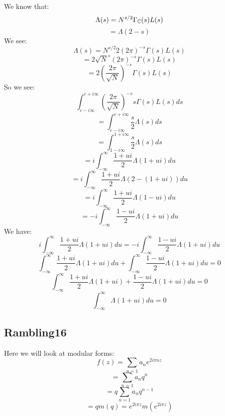 \documentclass[a4paper]{amsart}
\begin{document}
We know that:
$$\Lambda(s) = N^{s/2} \Gamma_{\mathbb{C}}(s) L(s)$$
$$ = \Lambda(2 - s)$$
We see: 
$$\Lambda(s) = N^{s/2} 2 (2\pi)^{-s} \Gamma(s) L(s)$$
$$ = 2 \sqrt{N}^{s} (2\pi)^{-s} \Gamma(s) L(s)$$
$$ = 2 \left(\frac{2\pi}{\sqrt{N}}\right)^{-s} \Gamma(s) L(s)$$
So we see:
$$\int_{c - i\infty}^{c + i\infty}\left(\frac{2\pi}{\sqrt{N}}\right)^{-s}s\Gamma(s)L(s)ds$$
$$ = \int_{c - i\infty}^{c + i\infty}\frac{s}{2} \Lambda(s)ds$$
$$ = \int_{1 - i\infty}^{1 + i\infty}\frac{s}{2} \Lambda(s)ds$$
$$ = i \int_{-\infty}^{\infty}\frac{1 + ui}{2} \Lambda(1 + ui)du$$
$$ = i \int_{-\infty}^{\infty}\frac{1 + ui}{2} \Lambda(2 - (1 + ui))du$$
$$ = i \int_{-\infty}^{\infty}\frac{1 + ui}{2} \Lambda(1 - ui)du$$
$$ = -i \int_{-\infty}^{\infty}\frac{1 - ui}{2} \Lambda(1 + ui)du$$
We have:
$$i \int_{-\infty}^{\infty}\frac{1 + ui}{2} \Lambda(1 + ui)du = -i \int_{-\infty}^{\infty}\frac{1 - ui}{2} \Lambda(1 + ui)du$$
$$ \int_{-\infty}^{\infty}\frac{1 + ui}{2} \Lambda(1 + ui)du + \int_{-\infty}^{\infty}\frac{1 - ui}{2} \Lambda(1 + ui)du= 0$$
$$ \int_{-\infty}^{\infty}\frac{1 + ui}{2} \Lambda(1 + ui) + \frac{1 - ui}{2} \Lambda(1 + ui)du = 0$$
$$ \int_{-\infty}^{\infty}\Lambda(1 + ui)du = 0$$


\subsection{Rambling16}
Here we will look at modular forms:
$$f(z) = \sum_{n = 1} a_n e^{2i\pi nz}$$
$$ = \sum_{n = 1} a_n q^n$$
$$ = q \sum_{n = 1} a_n q^{n - 1}$$
$$ = q m(q) = e^{2i\pi z} m(e^{2i\pi z})$$
\end{document}

